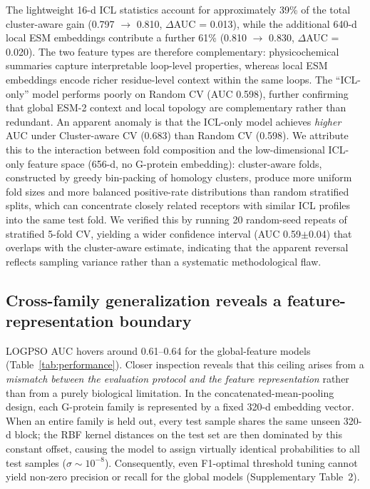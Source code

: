 \documentclass[11pt,a4paper]{article}
\begin{document}
The lightweight 16-d ICL statistics account for approximately 39\% of the total cluster-aware gain (0.797 $\rightarrow$ 0.810, $\Delta$AUC = 0.013), while the additional 640-d local ESM embeddings contribute a further 61\% (0.810 $\rightarrow$ 0.830, $\Delta$AUC = 0.020). The two feature types are therefore complementary: physicochemical summaries capture interpretable loop-level properties, whereas local ESM embeddings encode richer residue-level context within the same loops. The ``ICL-only'' model performs poorly on Random CV (AUC 0.598), further confirming that global ESM-2 context and local topology are complementary rather than redundant. An apparent anomaly is that the ICL-only model achieves \emph{higher} AUC under Cluster-aware CV (0.683) than Random CV (0.598). We attribute this to the interaction between fold composition and the low-dimensional ICL-only feature space (656-d, no G-protein embedding): cluster-aware folds, constructed by greedy bin-packing of homology clusters, produce more uniform fold sizes and more balanced positive-rate distributions than random stratified splits, which can concentrate closely related receptors with similar ICL profiles into the same test fold. We verified this by running 20 random-seed repeats of stratified 5-fold CV, yielding a wider confidence interval (AUC 0.59$\pm$0.04) that overlaps with the cluster-aware estimate, indicating that the apparent reversal reflects sampling variance rather than a systematic methodological flaw.

\subsection{Cross-family generalization reveals a feature-representation boundary}

LOGPSO AUC hovers around 0.61--0.64 for the global-feature models (Table~\ref{tab:performance}). Closer inspection reveals that this ceiling arises from a \emph{mismatch between the evaluation protocol and the feature representation} rather than from a purely biological limitation. In the concatenated-mean-pooling design, each G-protein family is represented by a fixed 320-d embedding vector. When an entire family is held out, every test sample shares the same unseen 320-d block; the RBF kernel distances on the test set are then dominated by this constant offset, causing the model to assign virtually identical probabilities to all test samples ($\sigma \sim 10^{-8}$). Consequently, even F1-optimal threshold tuning cannot yield non-zero precision or recall for the global models (Supplementary Table~2).
\end{document}
